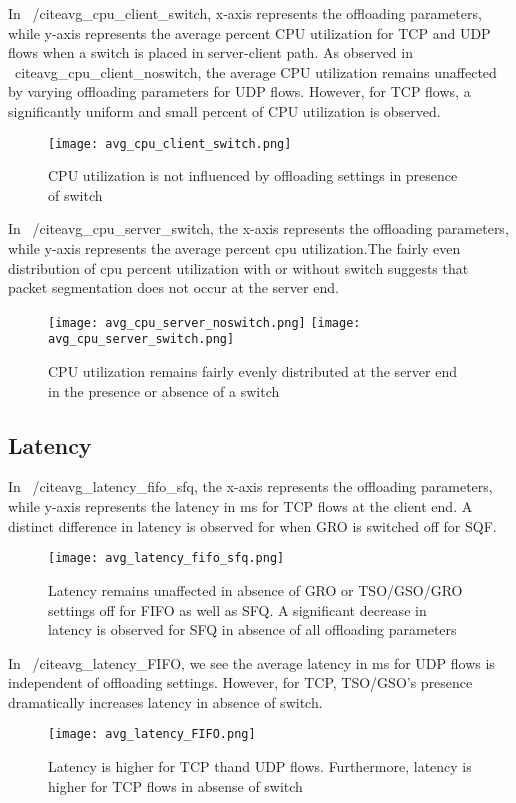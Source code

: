 In ~/cite{avg_cpu_client_switch}, x-axis represents the offloading parameters,
   while y-axis represents the average percent CPU utilization for TCP and UDP
   flows when a switch is placed in server-client path. As observed in
   ~cite{avg_cpu_client_noswitch}, the average CPU utilization remains
   unaffected by varying offloading parameters for UDP flows. However, for TCP
   flows, a significantly uniform and small percent of CPU utilization is
   observed. 
\begin{figure}[t] 
\texttt{[image: avg\_cpu\_client\_switch.png]}
\caption{CPU utilization is not influenced by offloading settings in presence of
    switch} 
\label{fig:avg_cpu_client_switch} 
\end{figure}

In ~/cite{avg_cpu_server_switch}, the x-axis represents the offloading
parameters, while y-axis represents the average percent cpu utilization.The
fairly even distribution of cpu percent utilization with or without switch
suggests that packet segmentation does not occur at the server end.
\begin{figure}[t] 
\texttt{[image: avg\_cpu\_server\_noswitch.png]}
\texttt{[image: avg\_cpu\_server\_switch.png]} 
\caption{CPU utilization
    remains fairly evenly distributed at the server end in the presence or
        absence of a switch} 
\label{fig:avg_cpu_server_noswitch} 
\end{figure}

\subsection{Latency}
In ~/cite{avg_latency_fifo_sfq}, the x-axis represents the offloading parameters,
   while y-axis represents the latency in ms for TCP flows at the client end. A
   distinct difference in latency is observed for when GRO is switched off for
   SQF. 
\begin{figure}[t] \texttt{[image: avg\_latency\_fifo\_sfq.png]}
\caption{Latency remains unaffected in absence of GRO or TSO/GSO/GRO settings
    off for FIFO as well as SFQ. A significant decrease in latency is observed
        for SFQ in absence of all offloading parameters}
        \label{fig:avg_latency_fifo_sfq} \end{figure}

In ~/cite{avg_latency_FIFO}, we see the average latency in ms for UDP flows is
independent of offloading settings. However, for TCP, TSO/GSO's presence
dramatically increases latency in absence of switch. 
\begin{figure}[t] \texttt{[image: avg\_latency\_FIFO.png]}
\caption{Latency is higher for TCP thand UDP flows. Furthermore, latency is
    higher for TCP flows in absense of switch} \label{fig:avg_latency_FIFO}
    \end{figure}


